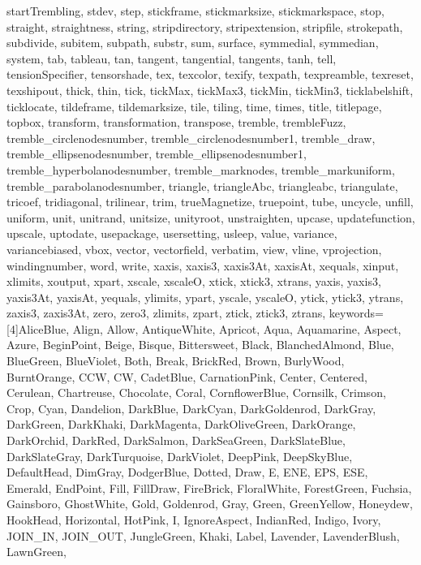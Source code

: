{{  startTrembling, stdev, step, stickframe, stickmarksize, stickmarkspace, stop,
  straight, straightness, string, stripdirectory, stripextension, stripfile,
  strokepath, subdivide, subitem, subpath, substr, sum, surface, symmedial,
  symmedian, system, tab, tableau, tan, tangent, tangential, tangents, tanh,
  tell, tensionSpecifier, tensorshade, tex, texcolor, texify, texpath,
  texpreamble, texreset, texshipout, thick, thin, tick, tickMax, tickMax3,
  tickMin, tickMin3, ticklabelshift, ticklocate, tildeframe, tildemarksize,
  tile, tiling, time, times, title, titlepage, topbox, transform,
  transformation, transpose, tremble, trembleFuzz, tremble_circlenodesnumber,
  tremble_circlenodesnumber1, tremble_draw, tremble_ellipsenodesnumber,
  tremble_ellipsenodesnumber1, tremble_hyperbolanodesnumber, tremble_marknodes,
  tremble_markuniform, tremble_parabolanodesnumber, triangle, triangleAbc,
  triangleabc, triangulate, tricoef, tridiagonal, trilinear, trim,
  trueMagnetize, truepoint, tube, uncycle, unfill, uniform, unit, unitrand,
  unitsize, unityroot, unstraighten, upcase, updatefunction, upscale, uptodate,
  usepackage, usersetting, usleep, value, variance, variancebiased, vbox,
  vector, vectorfield, verbatim, view, vline, vprojection, windingnumber, word,
  write, xaxis, xaxis3, xaxis3At, xaxisAt, xequals, xinput, xlimits, xoutput,
  xpart, xscale, xscaleO, xtick, xtick3, xtrans, yaxis, yaxis3, yaxis3At,
  yaxisAt, yequals, ylimits, ypart, yscale, yscaleO, ytick, ytick3, ytrans,
  zaxis3, zaxis3At, zero, zero3, zlimits, zpart, ztick, ztick3, ztrans},
  keywords=[4]{AliceBlue, Align, Allow, AntiqueWhite, Apricot, Aqua,
  Aquamarine, Aspect, Azure, BeginPoint, Beige, Bisque, Bittersweet, Black,
  BlanchedAlmond, Blue, BlueGreen, BlueViolet, Both, Break, BrickRed, Brown,
  BurlyWood, BurntOrange, CCW, CW, CadetBlue, CarnationPink, Center, Centered,
  Cerulean, Chartreuse, Chocolate, Coral, CornflowerBlue, Cornsilk, Crimson,
  Crop, Cyan, Dandelion, DarkBlue, DarkCyan, DarkGoldenrod, DarkGray,
  DarkGreen, DarkKhaki, DarkMagenta, DarkOliveGreen, DarkOrange, DarkOrchid,
  DarkRed, DarkSalmon, DarkSeaGreen, DarkSlateBlue, DarkSlateGray,
  DarkTurquoise, DarkViolet, DeepPink, DeepSkyBlue, DefaultHead, DimGray,
  DodgerBlue, Dotted, Draw, E, ENE, EPS, ESE, Emerald, EndPoint, Fill,
  FillDraw, FireBrick, FloralWhite, ForestGreen, Fuchsia, Gainsboro,
  GhostWhite, Gold, Goldenrod, Gray, Green, GreenYellow, Honeydew, HookHead,
  Horizontal, HotPink, I, IgnoreAspect, IndianRed, Indigo, Ivory, JOIN_IN,
  JOIN_OUT, JungleGreen, Khaki, Label, Lavender, LavenderBlush, LawnGreen,
}}
